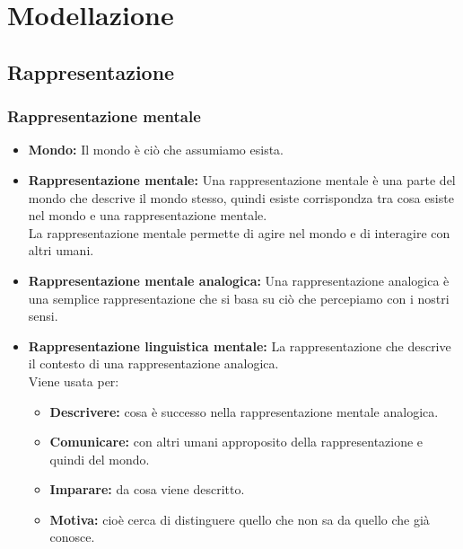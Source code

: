 \documentclass[../main.tex]{subfiles}
\begin{document}
    \part{Modellazione}
    \chapter{Rappresentazione}

    \section{Rappresentazione mentale}
    \begin{itemize}
        \item \textbf{Mondo:} Il mondo è ciò che assumiamo esista.
        \item \textbf{Rappresentazione mentale:} Una rappresentazione mentale è una parte del mondo che descrive il mondo stesso, quindi esiste corrispondza tra cosa esiste nel mondo e una rappresentazione mentale.\\
            La rappresentazione mentale permette di agire nel mondo e di interagire con altri umani.
        \item \textbf{Rappresentazione mentale analogica:} Una rappresentazione analogica è una semplice rappresentazione che si basa su ciò che percepiamo con i nostri sensi.
        \item \textbf{Rappresentazione linguistica mentale:} La rappresentazione che descrive il contesto di una rappresentazione analogica.\\
            Viene usata per:
            \begin{itemize}
                \item \textbf{Descrivere:} cosa è successo nella rappresentazione mentale analogica.
                \item \textbf{Comunicare:} con altri umani approposito della rappresentazione e quindi del mondo.
                \item \textbf{Imparare:} da cosa viene descritto.
                \item \textbf{Motiva:} cioè cerca di distinguere quello che non sa da quello che già conosce. 
            \end{itemize}
    \end{itemize}
\end{document}
